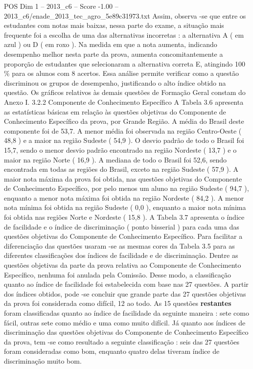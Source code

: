 \begin{textsample}{POS Dim 1 – 2013\_c6 – Score -1.00 – 2013\_c6/enade\_2013\_tec\_agro\_5e89c31973.txt}
Assim, observa -se que entre os estudantes com notas mais baixas, nessa parte do exame, a situação mais frequente foi a escolha de uma das alternativas incorretas : a alternativa A ( em azul ) ou D ( em roxo ).
Na medida em que a nota aumenta, indicando desempenho melhor nesta parte da prova, aumenta concomitantemente a proporção de estudantes que selecionaram a alternativa correta E, atingindo 100 \% para os alunos com 8 acertos.
Essa análise permite verificar como a questão discriminou os grupos de desempenho, justificando o alto índice obtido na questão.
Os gráficos relativos às demais questões de Formação Geral constam do Anexo I. 3.2.2 Componente de Conhecimento Específico A Tabela 3.6 apresenta as estatísticas básicas em relação às questões objetivas do Componente de Conhecimento Específico da prova, por Grande Região.
A média do Brasil deste componente foi de 53,7.
A menor média foi observada na região Centro-Oeste ( 48,8 ) e a maior na região Sudeste ( 54,9 ).
O desvio padrão de todo o Brasil foi 15,7, sendo o menor desvio padrão encontrado na região Nordeste ( 13,7 ) e o maior na região Norte ( 16,9 ).
A mediana de todo o Brasil foi 52,6, sendo encontrada em todas as regiões do Brasil, exceto na região Sudeste ( 57,9 ).
A maior nota máxima da prova foi obtida, nas questões objetivas do Componente de Conhecimento Específico, por pelo menos um aluno na região Sudeste ( 94,7 ), enquanto a menor nota máxima foi obtida na região Nordeste ( 84,2 ).
A menor nota mínima foi obtida na região Sudeste ( 0,0 ), enquanto a maior nota mínima foi obtida nas regiões Norte e Nordeste ( 15,8 ).
A Tabela 3.7 apresenta o índice de facilidade e o índice de discriminação ( ponto bisserial ) para cada uma das questões objetivas do Componente de Conhecimento Específico.
Para facilitar a diferenciação das questões usaram -se as mesmas cores da Tabela 3.5 para as diferentes classificações dos índices de facilidade e de discriminação.
Dentre as questões objetivas da parte da prova relativa ao Componente de Conhecimento Específico, nenhuma foi anulada pela Comissão.
Desse modo, a classificação quanto ao índice de facilidade foi estabelecida com base nas 27 questões.
A partir dos índices obtidos, pode -se concluir que grande parte das 27 questões objetivas da prova foi considerada como difícil, 12 ao todo.
As 15 questões \textbf{restantes} foram classificadas quanto ao índice de facilidade da seguinte maneira : sete como fácil, outras sete como médio e uma como muito difícil.
Já quanto aos índices de discriminação das questões objetivas do Componente de Conhecimento Específico da prova, tem -se como resultado a seguinte classificação : seis das 27 questões foram consideradas como bom, enquanto quatro delas tiveram índice de discriminação muito bom.

\end{textsample}
